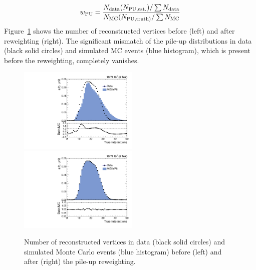 \begin{equation}
 {w_{\rm PU} = \frac {N_{\rm data} (N_{\rm PU,est.})/\sum N_{\rm data}} {N_{\rm MC} (N_{\rm PU,truth)}/\sum N_{\rm MC}}}
\end{equation}
Figure~\ref{fig:pileup} shows the number of reconstructed vertices before (left) and after reweighting (right). The significant mismatch of the pile-up distributions in data (black solid circles) and simulated MC events (blue histogram), which is present before the reweighting, completely vanishes. 

\begin{figure}[ht]
 \begin{center}
 \hspace*{-5mm}\includegraphics[width=0.51\textwidth]{Plots_HT_2_150/Nvertices.pdf}%
 ~~\includegraphics[width=0.51\textwidth]{Plots_HT_2_150/Nvertices_weight.pdf}
 \caption{Number of reconstructed vertices in data (black solid circles) and simulated Monte Carlo events (blue histogram) before (left) and after (right) the pile-up reweighting.}
 \label{fig:pileup}
 \end{center}
\end{figure}

